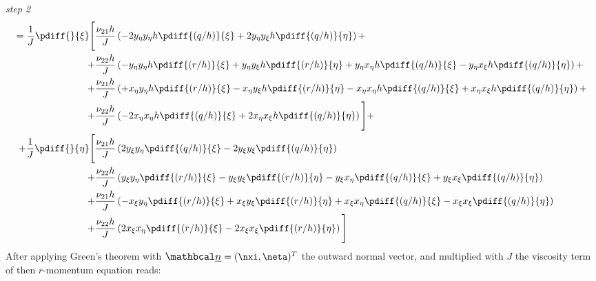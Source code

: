 %
\textit{step 2}
\begin{align}
= \frac{1}{J} \pdiff{}{\xi} \Bigg[ &
\frac{\nu_{21} h}{J} \left(
- 2 y_{\eta} y_{\eta} h\pdiff{(q/h)}{\xi}
+ 2 y_{\eta} y_{\xi} h\pdiff{(q/h)}{\eta}
\right)
+
\\
+ &\frac{\nu_{22} h}{J} \left(
- y_{\eta} y_{\eta} h \pdiff{(r/h)}{\xi}
+ y_{\eta} y_{\xi} h \pdiff{(r/h)}{\eta}
+ y_{\eta} x_{\eta} h \pdiff{(q/h)}{\xi}
- y_{\eta} x_{\xi} h \pdiff{(q/h)}{\eta}
\right)
+
\\
+ &\frac{\nu_{21} h}{J} \left(
+ x_{\eta} y_{\eta} h \pdiff{(r/h)}{\xi}
- x_{\eta} y_{\xi} h \pdiff{(r/h)}{\eta}
- x_{\eta} x_{\eta} h \pdiff{(q/h)}{\xi}
+ x_{\eta} x_{\xi} h \pdiff{(q/h)}{\eta}
\right)
+
\\
+ &\frac{\nu_{22} h}{J} \left(
- 2 x_{\eta} x_{\eta} h\pdiff{(q/h)}{\xi}
+ 2 x_{\eta} x_{\xi} h\pdiff{(q/h)}{\eta}
\right)
\Bigg] +
\\
+ \frac{1}{J} \pdiff{}{\eta}\Bigg[ &
\frac{\nu_{21} h}{J} \left(
  2 y_{\xi} y_{\eta} \pdiff{(q/h)}{\xi}
- 2 y_{\xi} y_{\xi} \pdiff{(q/h)}{\eta}
\right)
\\* + &
\frac{\nu_{22} h}{J} \left(
  y_{\xi}y_{\eta} \pdiff{(r/h)}{\xi}
- y_{\xi}y_{\xi} \pdiff{(r/h)}{\eta}
- y_{\xi}x_{\eta} \pdiff{(q/h)}{\xi}
+ y_{\xi}x_{\xi} \pdiff{(q/h)}{\eta}
\right)
\\* + &
\frac{\nu_{21} h}{J} \left(
- x_{\xi}y_{\eta} \pdiff{(r/h)}{\xi}
+ x_{\xi}y_{\xi} \pdiff{(r/h)}{\eta}
+ x_{\xi}x_{\eta} \pdiff{(q/h)}{\xi}
- x_{\xi}x_{\xi} \pdiff{(q/h)}{\eta}
\right)
\\* + &
\frac{\nu_{22} h}{J} \left(
  2 x_{\xi}x_{\eta} \pdiff{(r/h)}{\xi}
- 2 x_{\xi}x_{\xi} \pdiff{(r/h)}{\eta}
\right)
\Bigg]
\label{eq:eta_viscous_term}
\end{align}
After applying Green’s theorem with
$\vecn = (\nxi, \neta)^T$ the outward normal vector, and multiplied with $J$  the viscosity term of then $r$-momentum equation reads:
